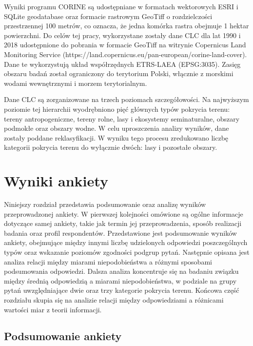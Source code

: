 \documentclass{amuthesis}
\begin{document}
Wyniki programu CORINE są udostępniane w formatach wektorowych ESRI i
SQLite geodatabase oraz formacie rastrowym GeoTiff o rozdzielczości
przestrzennej 100 metrów, co oznacza, że jedna komórka rastra obejmuje 1
hektar powierzchni. Do celów tej pracy, wykorzystane zostały dane CLC
dla lat 1990 i 2018 udostępnione do pobrania w formacie GeoTiff na
witrynie Copernicus Land Monitoring Service
(https://land.copernicus.eu/pan-european/corine-land-cover). Dane te
wykorzystują układ współrzędnych ETRS-LAEA (EPSG:3035). Zasięg obszaru
badań został ograniczony do terytorium Polski, włącznie z morskimi
wodami wewnętrznymi i morzem terytorialnym.

Dane CLC są zorganizowane na trzech poziomach szczegółowości. Na
najwyższym poziomie tej hierarchii wyodrębniono pięć głównych typów
pokrycia terenu: tereny antropogeniczne, tereny rolne, lasy i ekosystemy
seminaturalne, obszary podmokłe oraz obszary wodne. W celu uproszczenia
analizy wyników, dane zostały poddane reklasyfikacji. W wyniku tego
procesu zredukowano liczbę kategorii pokrycia terenu do wyłącznie dwóch:
lasy i pozostałe obszary.


\hypertarget{sec-wyniki}{%
\chapter{Wyniki ankiety}\label{sec-wyniki}}

Niniejszy rozdział przedstawia podsumowanie oraz analizę wyników
przeprowadzonej ankiety. W pierwszej kolejności omówione są ogólne
informacje dotyczące samej ankiety, takie jak termin jej
przeprowadzenia, sposób realizacji badania oraz profil respondentów.
Przedstawione jest podsumowanie wyników ankiety, obejmujące między
innymi liczbę udzielonych odpowiedzi poszczególnych typów oraz wskazanie
poziomów zgodności podgrup pytań. Następnie opisana jest analiza relacji
między miarami niepodobieństwa a różnymi sposobami podsumowania
odpowiedzi. Dalsza analiza koncentruje się na badaniu związku między
średnią odpowiedzią a miarami niepodobieństwa, w podziale na grupy pytań
uwzględniające dwie oraz trzy kategorie pokrycia terenu. Końcowa część
rozdziału skupia się na analizie relacji między odpowiedziami a
różnicami wartości miar z teorii informacji.

\hypertarget{podsumowanie-ankiety}{%
\section{Podsumowanie ankiety}\label{podsumowanie-ankiety}}
\end{document}

